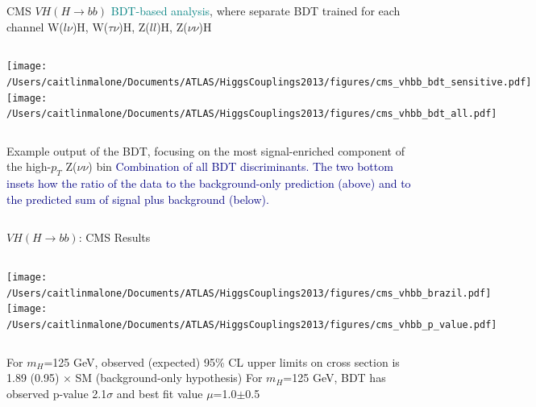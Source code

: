 \documentclass{beamer}
\begin{document}
\begin{frame}{CMS $VH (H\rightarrow bb)$}
	\scriptsize
	 \textcolor{Teal}{BDT-based analysis}, where separate BDT trained for each channel W($l\nu$)H, W($\tau\nu$)H, Z($ll$)H, Z($\nu\nu$)H
	 
	 \vspace{0.5cm}
	 
	 \begin{columns}[c]
			\texttt{[image: /Users/caitlinmalone/Documents/ATLAS/HiggsCouplings2013/figures/cms\_vhbb\_bdt\_sensitive.pdf]}	\\
	
			\texttt{[image: /Users/caitlinmalone/Documents/ATLAS/HiggsCouplings2013/figures/cms\_vhbb\_bdt\_all.pdf]}\\

	\end{columns}
	
	\vspace{0.5cm}
	
	\begin{columns}
			\scriptsize
			Example output of the BDT, focusing on the \textcolor{BrickRed}{most signal-enriched component of the high-$p_T$ Z($\nu\nu$) bin}
			\scriptsize
			\textcolor{Navy}{Combination of all BDT discriminants.  The two bottom insets how the ratio of the data to the background-only prediction (above) and to the predicted sum of signal plus background (below).}
	\end{columns}
\end{frame}





\begin{frame}{$VH (H\rightarrow bb)$: CMS Results}
	\begin{columns}[c]
		\column{0.5\textwidth}
			\texttt{[image: /Users/caitlinmalone/Documents/ATLAS/HiggsCouplings2013/figures/cms\_vhbb\_brazil.pdf]}
		\column{0.5\textwidth}
			\texttt{[image: /Users/caitlinmalone/Documents/ATLAS/HiggsCouplings2013/figures/cms\_vhbb\_p\_value.pdf]}
	\end{columns}
		
	\begin{columns}[c]
			\scriptsize
			For $m_H$=125 GeV, observed (expected) 95\% CL upper limits on cross section is 1.89 (0.95) $\times$ SM (background-only hypothesis)
			\scriptsize
			For $m_H$=125 GeV, BDT has observed p-value 2.1$\sigma$ and best fit value $\mu$=1.0$\pm$0.5
	\end{columns}
\end{frame}
\end{document}
